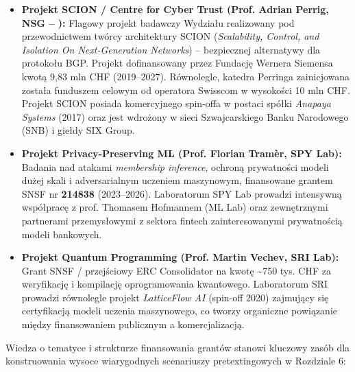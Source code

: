 \begin{itemize}
    \item \textbf{Projekt SCION / Centre for Cyber Trust (Prof. Adrian Perrig, NSG -- ):} Flagowy projekt badawczy Wydziału realizowany pod przewodnictwem twórcy architektury SCION (\textit{Scalability, Control, and Isolation On Next-Generation Networks}) -- bezpiecznej alternatywy dla protokołu BGP. Projekt dofinansowany przez Fundację Wernera Siemensa kwotą 9,83 mln CHF (2019--2027). Równolegle, katedra Perringa zainicjowana została funduszem celowym od operatora Swisscom w wysokości 10 mln CHF. Projekt SCION posiada komercyjnego spin-offa w postaci spółki \textit{Anapaya Systems} (2017) oraz jest wdrożony w sieci Szwajcarskiego Banku Narodowego (SNB) i giełdy SIX Group.
    \item \textbf{Projekt Privacy-Preserving ML (Prof. Florian Tramèr, SPY Lab):} Badania nad atakami \textit{membership inference}, ochroną prywatności modeli dużej skali i adversarialnym uczeniem maszynowym, finansowane grantem SNSF nr \textbf{214838} (2023--2026). Laboratorum SPY Lab prowadzi intensywną współpracę z prof. Thomasem Hofmannem (ML Lab) oraz zewnętrznymi partnerami przemysłowymi z sektora fintech zainteresowanymi prywatnością modeli bankowych.
    \item \textbf{Projekt Quantum Programming (Prof. Martin Vechev, SRI Lab):} Grant SNSF / przejściowy ERC Consolidator na kwotę \textasciitilde{}750 tys. CHF za weryfikację i kompilację oprogramowania kwantowego. Laboratorum SRI prowadzi równolegle projekt \textit{LatticeFlow AI} (spin-off 2020) zajmujący się certyfikacją modeli uczenia maszynowego, co tworzy organiczne powiązanie między finansowaniem publicznym a komercjalizacją.
\end{itemize}


Wiedza o tematyce i strukturze finansowania grantów stanowi kluczowy zasób dla konstruowania wysoce wiarygodnych scenariuszy pretextingowych w Rozdziale 6:

